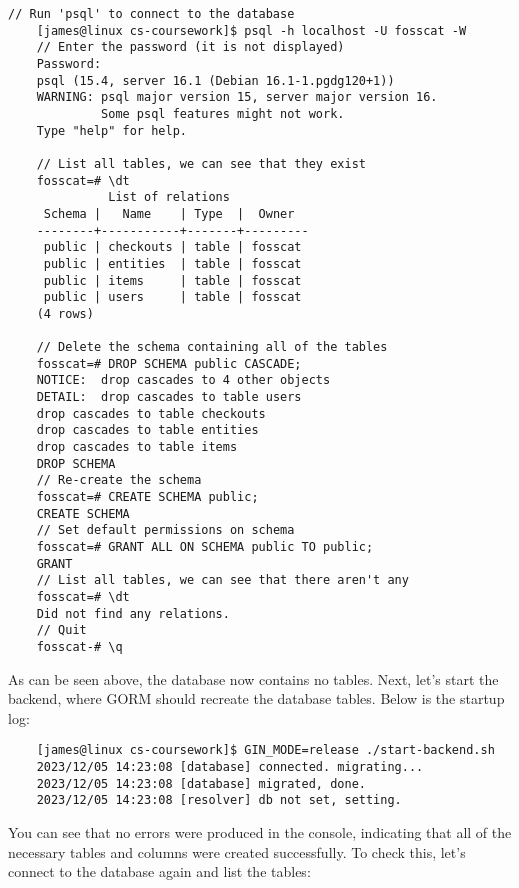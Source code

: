 \documentclass[../../main.tex]{subfiles}
\begin{document}
\begin{lstlisting}[language=custom_psql_commented]
    // Run 'psql' to connect to the database
    [james@linux cs-coursework]$ psql -h localhost -U fosscat -W
    // Enter the password (it is not displayed)
    Password: 
    psql (15.4, server 16.1 (Debian 16.1-1.pgdg120+1))
    WARNING: psql major version 15, server major version 16.
             Some psql features might not work.
    Type "help" for help.
    
    // List all tables, we can see that they exist
    fosscat=# \dt
              List of relations
     Schema |   Name    | Type  |  Owner  
    --------+-----------+-------+---------
     public | checkouts | table | fosscat
     public | entities  | table | fosscat
     public | items     | table | fosscat
     public | users     | table | fosscat
    (4 rows)
    
    // Delete the schema containing all of the tables
    fosscat=# DROP SCHEMA public CASCADE;
    NOTICE:  drop cascades to 4 other objects
    DETAIL:  drop cascades to table users
    drop cascades to table checkouts
    drop cascades to table entities
    drop cascades to table items
    DROP SCHEMA
    // Re-create the schema
    fosscat=# CREATE SCHEMA public;
    CREATE SCHEMA
    // Set default permissions on schema
    fosscat=# GRANT ALL ON SCHEMA public TO public;
    GRANT
    // List all tables, we can see that there aren't any
    fosscat=# \dt
    Did not find any relations.
    // Quit
    fosscat-# \q
    \end{lstlisting}

\noindent As can be seen above, the database now contains no tables. Next, let's start the backend, where GORM should recreate the database tables. Below is the startup log:

\begin{lstlisting}
    [james@linux cs-coursework]$ GIN_MODE=release ./start-backend.sh
    2023/12/05 14:23:08 [database] connected. migrating...
    2023/12/05 14:23:08 [database] migrated, done.
    2023/12/05 14:23:08 [resolver] db not set, setting.
    \end{lstlisting}

\noindent You can see that no errors were produced in the console, indicating that all of the necessary tables and columns were created successfully. To check this, let's connect to the database again and list the tables:
\end{document}

